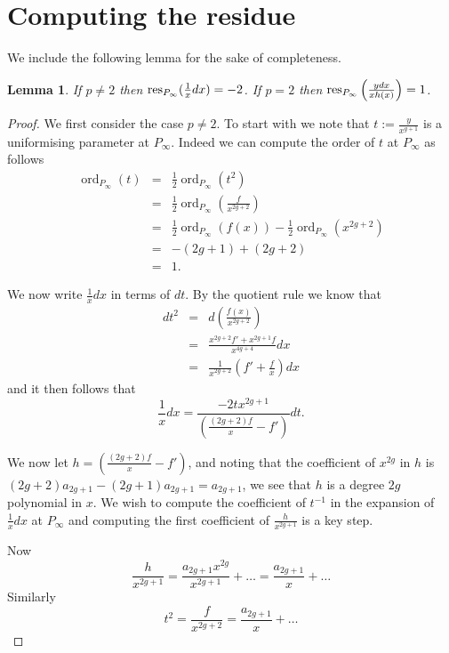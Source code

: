 \documentclass[draft, 11pt]{article} %
\theoremstyle{plain}
\newtheorem{lem}[defn]{Lemma}
\theoremstyle{remark}
\DeclareMathOperator{\ord}{ord}
\begin{document}
\section{Computing the residue}

We include the following lemma for the sake of completeness.

\begin{lem}
If $p \neq 2$ then ${\rm res}_{P_\infty}(\frac{1}{x}dx) = -2$.
If $p=2$ then ${\rm res}_{P_\infty}\left(\frac{ydx}{xh(x)}\right) = 1$.
\end{lem}

\begin{proof}

We first consider the case $p\neq 2$.
To start with we note that $t:= \frac{y}{x^{g+1}}$ is a uniformising parameter at $P_\infty$.
Indeed we can compute the order of $t$ at $P_\infty$ as follows
\begin{eqnarray}
\ord_{P_\infty}(t) & = & \frac{1}{2}\ord_{P_\infty}(t^2) \\
  & = & \frac{1}{2}\ord_{P_\infty}\left( \frac{f}{x^{2g+2}} \right) \\
& = & \frac{1}{2}\ord_{P_\infty}(f(x)) - \frac{1}{2}\ord_{P_\infty}(x^{2g+2})\\
& = & -(2g+1) + (2g+2) \\
& = & 1.
\end{eqnarray}

We now write $\frac{1}{x}dx$ in terms of $dt$.
By the quotient rule we know that
\begin{eqnarray*}
dt^2 & = & d \left( \frac{f(x)}{x^{2g+2}} \right) \\
& = & \frac{x^{2g+2}f' + x^{2g+1}f}{x^{4g+4}} dx \\
& = & \frac{1}{x^{2g+2}} \left( f' + \frac{f}{x} \right) dx
\end{eqnarray*}
and it then follows that
\[
\frac{1}{x}dx = \frac{-2tx^{2g+1}}{\left(\frac{(2g+2)f}{x} - f'\right)} dt.
\]


We now let $h = \left(\frac{(2g+2)f}{x} - f'\right)$, and noting that the coefficient of $x^{2g}$ in $h$ is $(2g+2)a_{2g+1} - (2g+1)a_{2g+1} = a_{2g+1}$, we see that $h$ is a degree $2g$ polynomial in $x$.
We wish to compute the coefficient of $t^{-1}$ in the expansion of $\frac{1}{x}dx$ at $P_\infty$ and computing the first coefficient of $\frac{h}{x^{2g+1}}$ is a key step.

Now
\[
\frac{h}{x^{2g+1}} = \frac{a_{2g+1}x^{2g}}{x^{2g+1}} + \ldots = \frac{a_{2g+1}}{x} + \ldots
\]
Similarly
\[
t^2 = \frac{f}{x^{2g+2} } = \frac{a_{2g+1}}{x} + \ldots
\]


\end{proof}
\end{document}
